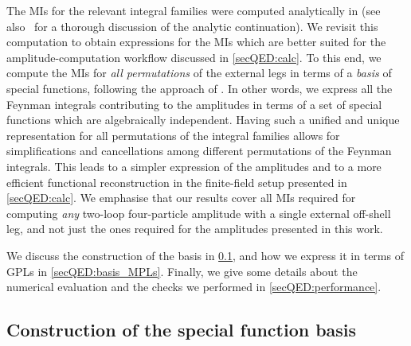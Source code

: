 \documentclass[main.tex]{subfiles}
\begin{document}
The MIs for the relevant integral families were computed analytically in  (see also~ for a thorough discussion of the analytic continuation).
We revisit this computation to obtain expressions for the MIs which are better suited for the amplitude-computation workflow discussed in \cref{secQED:calc}. To this end, we compute the MIs for \emph{all permutations} of the external legs in terms of a \emph{basis} of special functions, following the approach of . In other words, we express all the Feynman integrals contributing to the amplitudes in terms of a set of special functions which are algebraically independent. Having such a unified and unique representation for all permutations of the integral families allows for simplifications and cancellations among different permutations of the Feynman integrals. This leads to a simpler expression of the amplitudes and to a more efficient functional reconstruction in the finite-field setup presented in \cref{secQED:calc}. We emphasise that our results cover all MIs required for computing \emph{any} two-loop four-particle amplitude with a single external off-shell leg, and not just the ones required for the amplitudes presented in this work.

We discuss the construction of the basis in \cref{secQED:basis_construction}, and how we express it in terms of GPLs in \cref{secQED:basis_MPLs}. 
Finally, we give some details about the numerical evaluation and the checks we performed in \cref{secQED:performance}.


\subsection{Construction of the special function basis}
\label{secQED:basis_construction}
\end{document}
